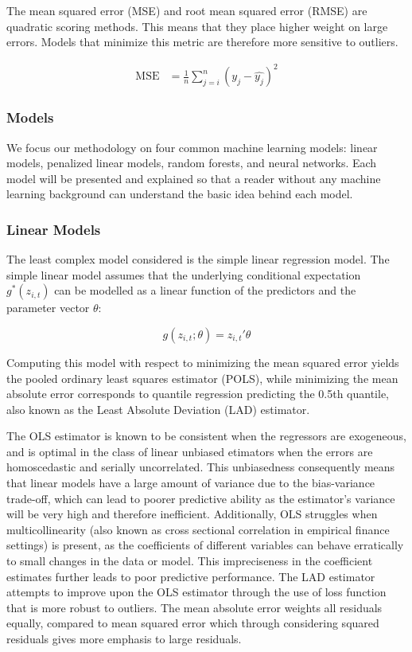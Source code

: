 \documentclass[11pt, a4paper, table]{article}
\begin{document}
The mean squared error (MSE) and root mean squared error (RMSE) are quadratic scoring methods. This means that they place higher weight on large errors. Models that minimize this metric are therefore more sensitive to outliers. 

\begin{align}
	\text{MSE} &= \frac{1}{n} \sum_{j = i}^{n} \left( y_j - \hat{y_j}\right) ^2
\end{align}

\subsubsection{Models}

We focus our methodology on four common machine learning models: linear models, penalized linear models, random forests, and neural networks. Each model will be presented and explained so that a reader without any machine learning background can understand the basic idea behind each model. 

\subsubsection{Linear Models}

The least complex model considered is the simple linear regression model. The simple linear model assumes that the underlying conditional expectation \( g^*(z_{i, t}) \) can be modelled as a linear function of the predictors and the parameter vector \( \theta \):

\begin{equation}
	g(z_{i, t};\theta) = z_{i, t}' \theta
\end{equation} 

Computing this model with respect to minimizing the mean squared error yields the pooled ordinary least squares estimator (POLS), while minimizing the mean absolute error corresponds to quantile regression predicting the 0.5th quantile, also known as the Least Absolute Deviation (LAD) estimator. 

The OLS estimator is known to be consistent when the regressors are exogeneous, and is optimal in the class of linear unbiased etimators when the errors are homoscedastic and serially uncorrelated. This unbiasedness consequently means that linear models have a large amount of variance due to the bias-variance trade-off, which can lead to poorer predictive ability as the estimator's variance will be very high and therefore inefficient. Additionally, OLS struggles when multicollinearity (also known as cross sectional correlation in empirical finance settings) is present, as the coefficients of different variables can behave erratically to small changes in the data or model. This impreciseness in the coefficient estimates further leads to poor predictive performance. The LAD estimator attempts to improve upon the OLS estimator through the use of loss function that is more robust to outliers. The mean absolute error weights all residuals equally, compared to mean squared error which through considering squared residuals gives more emphasis to large residuals. 
\end{document}

